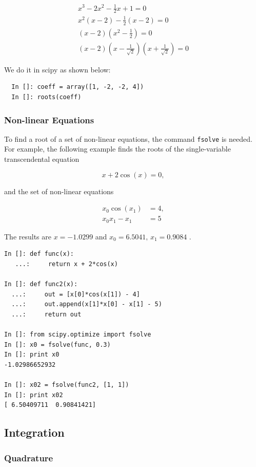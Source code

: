 \documentclass{article}
\begin{document}
\begin{align*}
x^3 - 2x^2 - \frac{1}{2}x + 1 = 0\\
x^2(x-2) - \frac{1}{2}(x-2) = 0\\
(x-2)(x^2 - \frac{1}{2}) = 0\\
(x-2)(x - \frac{1}{\sqrt{2}})(x + \frac{1}{\sqrt{2}}) = 0
\end{align*}

We do it in scipy as shown below:
\begin{lstlisting}
  In []: coeff = array([1, -2, -2, 4])
  In []: roots(coeff)
\end{lstlisting}

\subsubsection{Non-linear Equations}

To find a root of a set of non-linear equations, the command
\lstinline+fsolve+ is needed. For example, the following example finds
the roots of the single-variable transcendental equation

    \[ x+2\cos\left(x\right)=0,\]

and the set of non-linear equations

    \begin{align} 
      x_{0}\cos\left(x_{1}\right) &= 4,\\ 
      x_{0}x_{1}-x_{1} &= 5
    \end{align}

The results are $x=-1.0299$ and $x_{0}=6.5041,\, x_{1}=0.9084$ .

\begin{lstlisting}
In []: def func(x):
   ...:     return x + 2*cos(x)

In []: def func2(x):
  ...:     out = [x[0]*cos(x[1]) - 4]
  ...:     out.append(x[1]*x[0] - x[1] - 5)
  ...:     return out

In []: from scipy.optimize import fsolve
In []: x0 = fsolve(func, 0.3)
In []: print x0
-1.02986652932

In []: x02 = fsolve(func2, [1, 1])
In []: print x02
[ 6.50409711  0.90841421]
\end{lstlisting}

\subsection{Integration}
\subsubsection{Quadrature}
\end{document}
